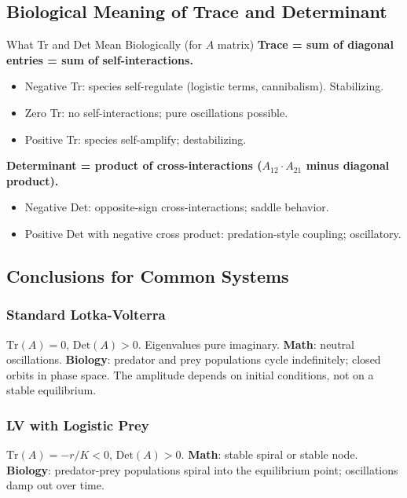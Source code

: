 \documentclass[11pt]{article}
\begin{document}
\subsection{Biological Meaning of Trace and Determinant}

\begin{conceptbox}{What Tr and Det Mean Biologically (for $A$ matrix)}
\textbf{Trace = sum of diagonal entries = sum of self-interactions.}
\begin{itemize}
\item Negative Tr: species self-regulate (logistic terms, cannibalism). Stabilizing.
\item Zero Tr: no self-interactions; pure oscillations possible.
\item Positive Tr: species self-amplify; destabilizing.
\end{itemize}

\textbf{Determinant = product of cross-interactions ($A_{12}\cdot A_{21}$ minus diagonal product).}
\begin{itemize}
\item Negative Det: opposite-sign cross-interactions; saddle behavior.
\item Positive Det with negative cross product: predation-style coupling; oscillatory.
\end{itemize}
\end{conceptbox}

\subsection{Conclusions for Common Systems}

\subsubsection{Standard Lotka-Volterra}
$\text{Tr}(A) = 0$, $\text{Det}(A) > 0$. Eigenvalues pure imaginary. \textbf{Math}: neutral oscillations. \textbf{Biology}: predator and prey populations cycle indefinitely; closed orbits in phase space. The amplitude depends on initial conditions, not on a stable equilibrium.

\subsubsection{LV with Logistic Prey}
$\text{Tr}(A) = -r/K < 0$, $\text{Det}(A) > 0$. \textbf{Math}: stable spiral or stable node. \textbf{Biology}: predator-prey populations spiral into the equilibrium point; oscillations damp out over time.
\end{document}
